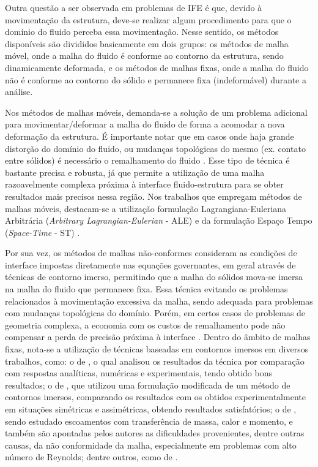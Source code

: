 Outra questão a ser observada em problemas de IFE é que, devido à movimentação da estrutura, deve-se realizar algum procedimento para que o domínio do fluido perceba essa movimentação. Nesse sentido, os métodos disponíveis são divididos basicamente em dois grupos: os métodos de malha móvel, onde a malha do fluido é conforme ao contorno da estrutura, sendo dinamicamente deformada, e os métodos de malhas fixas, onde a malha do fluido não é conforme ao contorno do sólido e permanece fixa (indeformável) durante a análise.

Nos métodos de malhas móveis, demanda-se a solução de um problema adicional para movimentar/deformar a malha do fluido de forma a acomodar a nova deformação da estrutura. É importante notar que em casos onde haja grande distorção do domínio do fluido, ou mudanças topológicas do mesmo (ex. contato entre sólidos) é necessário o remalhamento do fluido \cite{terahara2020heart}. Esse tipo de técnica é bastante precisa e robusta, já que permite a utilização de uma malha razoavelmente complexa próxima à interface fluido-estrutura para se obter resultados mais precisos nessa região. Nos trabalhos que empregam métodos de malhas móveis, destacam-se a utilização formulação Lagrangiana-Euleriana Arbitrária (\textit{Arbitrary Lagrangian-Eulerian} - ALE) \cite{donea1982arbitrary,kanchi20073d,fernandes2019ale} e da formulação Espaço Tempo (\textit{Space-Time} - ST) \cite{takizawa2011multiscale,terahara2020heart,takizawa2011stabilized}.

Por sua vez, os métodos de malhas não-conformes consideram as condições de interface impostas diretamente nas equações governantes, em geral através de técnicas de contorno imerso, permitindo que a malha do sólidos mova-se imersa na malha do fluido que permanece fixa. Essa técnica evitando os problemas relacionados à movimentação excessiva da malha, sendo adequada para problemas com mudanças topológicas do domínio. Porém, em certos casos de problemas de geometria complexa, a economia com os custos de remalhamento pode não compensar a perda de precisão próxima à interface \cite{bazilevs2013computational,hou2012numerical,bazilevs2015ale}. Dentro do âmbito de malhas fixas, nota-se a utilização de técnicas baseadas em contornos imersos em diversos trabalhos, como: o de , o qual analisou os resultados da técnica por comparação com respostas analíticas, numéricas e experimentais, tendo obtido bons resultados; o de , que utilizou uma formulação modificada de um método de contornos imersos, comparando os resultados com os obtidos experimentalmente em situações simétricas e assimétricas, obtendo resultados satisfatórios; o de , sendo estudado escoamentos com transferência de massa, calor e momento, e também são apontadas pelos autores as dificuldades provenientes, dentre outras causas, da não conformidade da malha, especialmente em problemas com alto número de Reynolds; dentre outros, como de .

